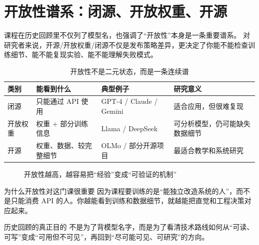 \section{开放性谱系：闭源、开放权重、开源}

课程在历史回顾里不仅列了模型名，也强调了“开放性”本身是一条重要谱系。
对研究者来说，开源/开放权重/闭源不仅是发布策略差异，更决定了你能不能检查训练细节、能不能复现实验、能不能理解失败模式。

\begin{table}[H]
\centering
\begin{tabular}{p{3.0cm}p{3.8cm}p{3.9cm}p{3.4cm}}
\toprule
\textbf{类别} & \textbf{能看到什么} & \textbf{典型例子} & \textbf{研究意义} \\
\midrule
闭源 & 只能通过 API 使用 & GPT-4 / Claude / Gemini & 适合应用，但很难复现 \\
开放权重 & 权重 + 部分训练信息 & Llama / DeepSeek & 可分析模型，仍可能缺失数据细节 \\
开源 & 权重、数据、较完整细节 & OLMo / 部分开源项目 & 最适合教学和系统研究 \\
\bottomrule
\end{tabular}
\caption{开放性不是二元状态，而是一条连续谱}
\end{table}

\begin{figure}[H]
\centering
{}
\caption{开放性越高，越容易把“经验”变成“可验证的机制”}
\end{figure}

\begin{knowledgebox}{为什么开放性对这门课很重要}
因为课程要训练的是“能独立改造系统的人”，而不是只能消费 API 的人。你越能看到训练和数据细节，就越能把直觉和工程决策对应起来。
\end{knowledgebox}

\begin{importantbox}{历史回顾的真正目的}
不是为了背模型名字，而是为了看清技术路线如何从“可读、可写”变成“可用但不可见”，再回到“尽可能可见、可研究”的方向。
\end{importantbox}

